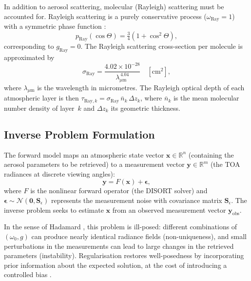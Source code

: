 \documentclass[a4paper, 11pt]{article}
\begin{document}
In addition to aerosol scattering, molecular (Rayleigh) scattering
must be accounted for.  Rayleigh scattering is a purely conservative
process
($\omega_{\text{Ray}} = 1$) with a symmetric phase function
\cite{liou2002}:
%
\begin{equation}
  p_{\text{Ray}}(\cos\Theta) = \tfrac{3}{4}(1 + \cos^2\Theta),
  \label{eq:rayleigh_phase}
\end{equation}
%
corresponding to $g_{\text{Ray}} = 0$.  The Rayleigh scattering
cross-section per molecule is approximated by \cite{bodhaine1999}
%
\begin{equation}
  \sigma_{\text{Ray}}
  = \frac{4.02 \times 10^{-28}}{\lambda_{\mu\text{m}}^{\,4.04}}
  \quad [\text{cm}^2],
  \label{eq:rayleigh_xs}
\end{equation}
%
where $\lambda_{\mu\text{m}}$ is the wavelength in micrometres.  The
Rayleigh optical depth of each atmospheric layer is then
$\tau_{\text{Ray},k} = \sigma_{\text{Ray}}\,\bar{n}_k\,\Delta z_k$,
where $\bar{n}_k$ is the mean molecular number density of layer~$k$
and $\Delta z_k$ its geometric thickness.


\subsection{Inverse Problem Formulation}
\label{sec:inverse_theory}

The forward model maps an atmospheric state vector
$\mathbf{x} \in \mathbb{R}^n$ (containing the aerosol parameters to
be retrieved) to a measurement vector
$\mathbf{y} \in \mathbb{R}^m$ (the TOA radiances at discrete viewing
angles):
%
\begin{equation}
  \mathbf{y} = F(\mathbf{x}) + \boldsymbol{\epsilon},
  \label{eq:forward}
\end{equation}
%
where $F$ is the nonlinear forward operator (the DISORT solver) and
$\boldsymbol{\epsilon} \sim \mathcal{N}(\mathbf{0},\mathbf{S}_\epsilon)$
represents the measurement noise with covariance matrix
$\mathbf{S}_\epsilon$.  The inverse problem seeks to estimate
$\mathbf{x}$ from an observed measurement vector
$\mathbf{y}_{\text{obs}}$.

In the sense of Hadamard \cite{hadamard1902}, this problem is ill-posed:
different combinations of $(\omega_0, g)$ can produce nearly
identical radiance fields (non-uniqueness), and small perturbations in
the measurements can lead to large changes in the retrieved parameters
(instability).  Regularisation restores well-posedness by incorporating
prior information about the expected solution, at the cost of
introducing a controlled bias \cite{tikhonov1977}.
\end{document}

